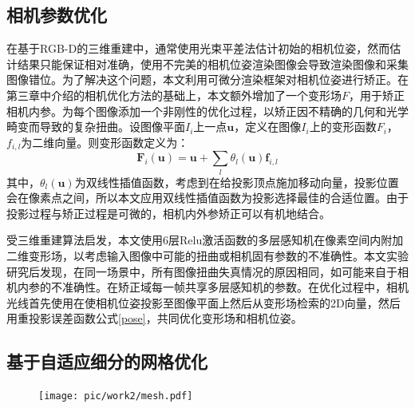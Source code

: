 \subsection{相机参数优化}
在基于RGB-D的三维重建中，通常使用光束平差法估计初始的相机位姿，然而估计结果只能保证相对准确，使用不完美的相机位姿渲染图像会导致渲染图像和采集图像错位。为了解决这个问题，本文利用可微分渲染框架对相机位姿进行矫正。在第三章中介绍的相机优化方法的基础上，本文额外增加了一个变形场$F$，用于矫正相机内参。为每个图像添加一个非刚性的优化过程，以矫正因不精确的几何和光学畸变而导致的复杂扭曲。设图像平面$I_i$上一点$\mathbf{u}$，定义在图像$I_i$上的变形函数$F_i$，$f_{i,l}$为二维向量。则变形函数定义为：
\begin{equation}
	\mathbf{F}_{i}(\mathbf{u})=\mathbf{u}+\sum_{l} \theta_{l}(\mathbf{u}) \mathbf{f}_{i, l}
\end{equation}
其中，$\theta_{l}(\mathbf{u})$为双线性插值函数，考虑到在给投影顶点施加移动向量，投影位置会在像素点之间，所以本文应用双线性插值函数为投影选择最佳的合适位置。由于投影过程与矫正过程是可微的，相机内外参矫正可以有机地结合。\par
受三维重建算法启发，本文使用6层Relu激活函数的多层感知机在像素空间内附加二维变形场，以考虑输入图像中可能的扭曲或相机固有参数的不准确性。本文实验研究后发现，在同一场景中，所有图像扭曲失真情况的原因相同，如可能来自于相机内参的不准确性。在矫正域每一帧共享多层感知机的参数。在优化过程中，相机光线首先使用在使相机位姿投影至图像平面上然后从变形场检索的2D向量，然后用重投影误差函数公式\eqref{pose}，共同优化变形场和相机位姿。

\subsection{基于自适应细分的网格优化}
\begin{figure}[ht]
    \centering

    \texttt{[image: pic/work2/mesh.pdf]}
    \label{fig:mesh}
\end{figure}


